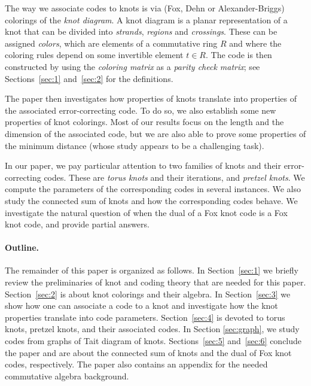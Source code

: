\documentclass[11pt,a4paper]{article}
\theoremstyle{definition}
\begin{document}
The way we associate codes to knots is via (Fox, Dehn or Alexander-Briggs) colorings of the \textit{knot diagram}. A knot diagram is a planar representation of a knot that can be divided into \textit{strands}, \textit{regions} and \textit{crossings}. These can be assigned \textit{colors}, which are elements of a commutative ring $R$ and where the coloring rules depend on some invertible element $t \in R$. The code is then constructed by using the \textit{coloring matrix} as a \textit{parity check matrix}; see Sections~\ref{sec:1} and~\ref{sec:2} for the definitions.

The paper then investigates how properties of knots translate into properties of the associated error-correcting code. To do so, we also establish some new properties of knot colorings. Most of our results focus on the length and the dimension of the associated code, but we are also able to 
prove some properties of the minimum distance (whose study appears to be a challenging task).

In our paper, we pay particular attention to two families of knots and their error-correcting codes.
These are \textit{torus knots} and their iterations, and \textit{pretzel knots}. We compute the parameters of the corresponding codes
in several instances. We also study the connected sum of knots and how the corresponding codes behave. We investigate the natural question of when the dual of a Fox knot code is a Fox knot code, and provide partial answers. 

\paragraph{Outline.} The remainder of this paper is organized as follows. In Section~\ref{sec:1}
we briefly review the preliminaries of knot and coding theory that are needed for this paper.
Section~\ref{sec:2} is about knot colorings and their algebra.
In Section~\ref{sec:3} we show how one can associate a code to a knot and investigate how the knot properties translate into code parameters. Section~\ref{sec:4} is devoted to torus knots, pretzel knots, and their associated codes. In Section \ref{sec:graph}, we study codes from graphs of Tait diagram of knots. Sections~\ref{sec:5} and~\ref{sec:6} conclude the paper and are about 
the connected sum of knots and the dual of Fox knot codes, respectively.
The paper also contains an appendix for the needed commutative algebra background.
\end{document}
